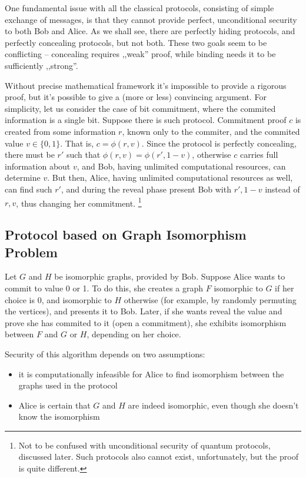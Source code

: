 \documentclass[10pt]{article}
\begin{document}
One fundamental issue with all the classical protocols, consisting of simple exchange of messages,
is that they cannot provide perfect, unconditional security to both Bob and Alice. As we shall see,
there are perfectly hiding protocols, and perfectly concealing protocols, but not both. These two
goals seem to be conflicting -- concealing requires ,,weak'' proof, while binding needs it to be
sufficiently ,,strong''.

Without precise mathematical framework it's impossible to provide a rigorous proof, but it's possible 
to give a (more or less) convincing argument. For simplicity, let us consider the case of bit 
commitment, where the commited information is a single bit. Suppose there is such protocol. Commitment 
proof \(c\) is created from some information \(r\), known only to the commiter, and the commited value 
\(v\in\{0,1\}\). That is, \(c=\phi(r,v)\). Since the protocol is perfectly concealing, there must
be \(r'\) such that \(\phi(r,v)=\phi(r',1-v)\), otherwise \(c\) carries full information about \(v\),
and Bob, having unlimited computational resources, can determine \(v\). But then, Alice, having 
unlimited computational resources as well, can find such \(r'\), and during the reveal phase present 
Bob with \(r', 1-v\) instead of \(r, v\), thus changing her commitment.
\footnote{Not to be confused with unconditional security of quantum protocols, discussed later.
Such protocols also cannot exist, unfortunately, but the proof is quite different.}

\subsection{Protocol based on Graph Isomorphism Problem}

Let \(G\) and \(H\) be isomorphic graphs, provided by Bob. Suppose Alice wants to commit to value 0
or 1. To do this, she creates a graph \(F\) isomorphic to \(G\) if her choice is 0, and isomorphic 
to \(H\) otherwise (for example, by randomly permuting the vertices), and presents it to Bob. Later,
if she wants reveal the value and prove she has commited to it (open a commitment), she exhibits 
isomorphism between \(F\) and \(G\) or \(H\), depending on her choice.

Security of this algorithm depends on two assumptions:

\begin{itemize}
  \item it is computationally infeasible for Alice to find isomorphism between the graphs used in the
    protocol
  \item Alice is certain that \(G\) and \(H\) are indeed isomorphic, even though she doesn't know
    the isomorphism
\end{itemize}
\end{document}
